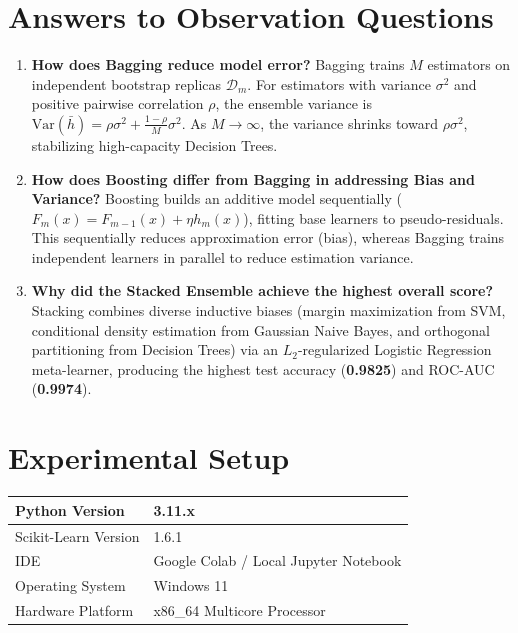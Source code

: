 \documentclass[12pt,a4paper]{article}
\begin{document}
\section{Answers to Observation Questions}
\begin{enumerate}[leftmargin=*]
    \item \textbf{How does Bagging reduce model error?}
    Bagging trains $M$ estimators on independent bootstrap replicas $\mathcal{D}_m$. For estimators with variance $\sigma^2$ and positive pairwise correlation $\rho$, the ensemble variance is $\text{Var}(\bar{h}) = \rho \sigma^2 + \frac{1-\rho}{M}\sigma^2$. As $M \rightarrow \infty$, the variance shrinks toward $\rho \sigma^2$, stabilizing high-capacity Decision Trees.
    
    \item \textbf{How does Boosting differ from Bagging in addressing Bias and Variance?}
    Boosting builds an additive model sequentially ($F_m(x) = F_{m-1}(x) + \eta h_m(x)$), fitting base learners to pseudo-residuals. This sequentially reduces approximation error (bias), whereas Bagging trains independent learners in parallel to reduce estimation variance.
    
    \item \textbf{Why did the Stacked Ensemble achieve the highest overall score?}
    Stacking combines diverse inductive biases (margin maximization from SVM, conditional density estimation from Gaussian Naive Bayes, and orthogonal partitioning from Decision Trees) via an $L_2$-regularized Logistic Regression meta-learner, producing the highest test accuracy (\textbf{0.9825}) and ROC-AUC (\textbf{0.9974}).
\end{enumerate}

\section{Experimental Setup}
\begin{longtable}{|p{6cm}|p{8cm}|}
\hline
Python Version & 3.11.x\\ \hline
Scikit-Learn Version & 1.6.1\\ \hline
IDE & Google Colab / Local Jupyter Notebook\\ \hline
Operating System & Windows 11\\ \hline
Hardware Platform & x86\_64 Multicore Processor\\ \hline
\end{longtable}
\end{document}
